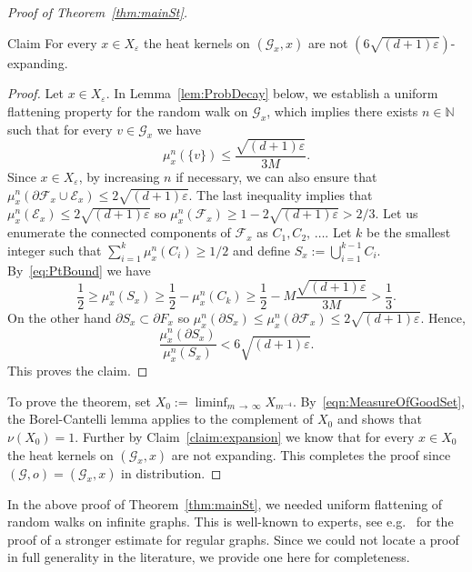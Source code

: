 \documentclass[AHL,Unicode,longabstracts,published]{cedram}
\newcommand{\bbN}{\mathbb{N}}
\newcommand{\calE}{\mathcal{E}}
\newcommand{\calF}{\mathcal{F}}
\newcommand{\calG}{\mathcal{G}}
\begin{document}
\begin{proof}[{Proof of Theorem~\ref{thm:mainSt}}]
\begin{enonce}[plain]{Claim}\label{claim:expansion}
For every $x\in X_\varepsilon$ the heat kernels on $(\calG_x,x)$ are not $(6\sqrt{(d+1)\varepsilon})$-expanding.
\end{enonce}

\begin{proof}
Let $x\in X_\varepsilon$. In Lemma~\ref{lem:ProbDecay} below, we establish a uniform flattening property for the random walk on $\calG_x$, which implies there exists $n\in\bbN$ such that for every $v\in \calG_x$ we have
\begin{equation}\label{eq:PtBound}
\mu_x^n(\{v\})\leq \frac{\sqrt{(d+1)\varepsilon}}{3M}.
\end{equation}
Since $x\in X_\varepsilon$, by increasing $n$ if necessary, we can also ensure that $\mu_x^n(\partial \calF_x\cup \calE_x)\leq 2{\sqrt{(d+1)\varepsilon}}$. The last inequality implies that $\mu_x^n(\calE_x)\leq 2{\sqrt{(d+1)\varepsilon}}$ so $\mu_x^n(\calF_x)\geq 1- 2{\sqrt{(d+1)\varepsilon}}>2/3$. Let us enumerate the connected components of $\calF_x$ as $C_1,C_2,\,\ldots.$ Let $k$ be the smallest integer such that $\sum_{i=1}^k \mu_x^n(C_i)\geq 1/2$ and define $S_x:=\bigcup_{i=1}^{k-1} C_i$. By~\eqref{eq:PtBound} we have
\[
\frac{1}{2}\geq \mu_x^n(S_x)\geq \frac{1}{2}-\mu_x^n(C_k)\geq \frac{1}{2} -M\frac{\sqrt{(d+1)\varepsilon}}{3M}> \frac{1}{3}.
\]
On the other hand $\partial S_x\subset \partial F_x$ so $\mu^n_x(\partial S_x)\leq \mu^n_x(\partial \calF_x)\leq 2\sqrt{(d+1)\varepsilon}.$ Hence,
\[
\frac{\mu_x^n(\partial S_x)}{\mu_x^n(S_x)}<6\sqrt{(d+1)\varepsilon}.
\]
This proves the claim.
\end{proof}

To prove the theorem, set $X_0:=\liminf_{m\,\to\,\infty} X_{m^{-4}}$. By~\eqref{eqn:MeasureOfGoodSet}, the Borel-Cantelli lemma applies to the complement of $X_0$ and shows that $\nu(X_0)=1$. Further by Claim~\ref{claim:expansion} we know that for every $x\in X_0$ the heat kernels on $(\calG_x,x)$ are not expanding. This completes the proof since $(\calG,o)=(\calG_x,x)$ in distribution.
\end{proof}

In the above proof of Theorem~\ref{thm:mainSt}, we needed uniform flattening of random walks on infinite graphs. This is well-known to experts, see e.g.~\cite[Lemma~3.2]{PeteTimar} for the proof of a stronger estimate for regular graphs. Since we could not locate a proof in full generality in the literature, we provide one here for completeness.
\end{document}

